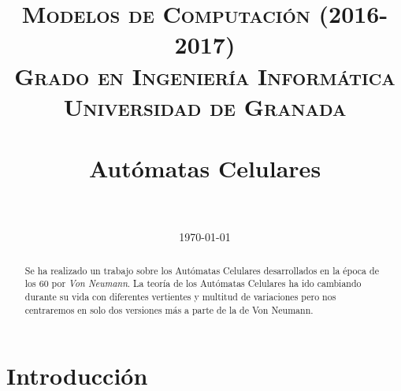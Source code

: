 


\title{	
\normalfont \normalsize 
\textsc{\textbf{Modelos de Computación (2016-2017)} \\ Grado en Ingeniería Informática \\ Universidad de Granada} \\ [25pt] %
\horrule{0.5pt} \\[0.4cm] %
\huge Autómatas Celulares \\ %
\horrule{2pt} \\[0.5cm] %
}

\date{\normalsize\today} %




\maketitle %

\newpage

\begin{abstract} 
Se ha realizado un trabajo sobre los Autómatas Celulares desarrollados en la época de los 60 por \textit{Von Neumann}. La teoría de los Autómatas Celulares ha ido cambiando durante su vida con diferentes vertientes y multitud de variaciones pero nos centraremos en solo dos versiones más a parte de la de Von Neumann.


\end{abstract}


\section{Introducción} %

